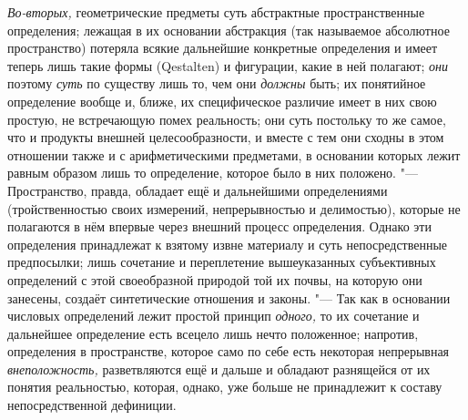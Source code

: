 {\em Во-вторых,}
геометрические предметы суть абстрактные пространственные
определения; лежащая в их основании абстракция (так называемое абсолютное
пространство) потеряла всякие дальнейшие конкретные определения и имеет
теперь лишь такие формы (Qestalten) и фигурации, какие в ней
полагают; {\em они}
поэтому {\em суть}
по существу лишь то, чем они
{\em должны} быть; их
понятийное определение вообще и, ближе, их специфическое
различие имеет в них свою простую, не встречающую помех реальность; они
суть постольку то же самое, что и продукты внешней целесообразности, и
вместе с тем они сходны в этом отношении также и с арифметическими
предметами, в основании которых лежит равным образом лишь то определение,
которое было в них положено. "--- Пространство, правда,
обладает ещё и дальнейшими определениями (тройственностью своих измерений,
непрерывностью и делимостью), которые не полагаются в нём впервые через
внешний процесс определения. Однако эти определения принадлежат к взятому
извне материалу и суть непосредственные предпосылки; лишь сочетание и
переплетение вышеуказанных субъективных определений с этой своеобразной
природой той их почвы, на которую они занесены, создаёт синтетические
отношения и законы. "--- Так как в основании числовых
определений лежит простой принцип
{\em одного,} то их
сочетание и дальнейшее определение есть всецело лишь нечто положенное;
напротив, определения в пространстве, которое само по себе есть некоторая
непрерывная {\em внеположность,}
разветвляются ещё и дальше и обладают разнящейся от их
понятия реальностью, которая, однако, уже больше не принадлежит к составу
непосредственной дефиниции.

